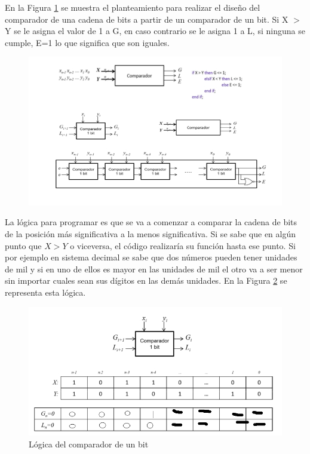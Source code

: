\documentclass[12pt,letterpaper]{book}
\begin{document}
\begin{multicols}{2}

En la Figura \ref{p2} se muestra el planteamiento para realizar el diseño del comparador de una cadena de bits a partir de un comparador de un bit. Si X $>$ Y se le asigna el valor de 1 a  G, en caso contrario se le asigna 1 a L, si ninguna se cumple, E=1 lo que significa que son iguales. 


\begin{figure}[H]
\centering
\includegraphics[width=1\linewidth]{figures/p2.png}
\caption{}
\label{p2}
\end{figure}
\vspace{0.2cm}

La lógica para programar es que se va a comenzar a comparar la cadena de bits de la posición más significativa a la menos significativa. Si se sabe que en algún punto que $X>Y$ o viceversa, el código realizaría su función hasta ese punto. Si por ejemplo en sistema decimal se sabe que dos números pueden tener unidades de mil y si en uno de ellos es mayor en las unidades de mil el otro va a ser menor sin importar cuales sean sus dígitos en las demás unidades. En la Figura \ref{p3} se representa esta lógica. 

\begin{figure}[H]
\centering
\includegraphics[width=1\linewidth]{figures/p3.png}
\caption{Lógica del comparador de un bit}
\label{p3}
\end{figure}
\vspace{0.2cm}


\end{multicols}
\end{document}
